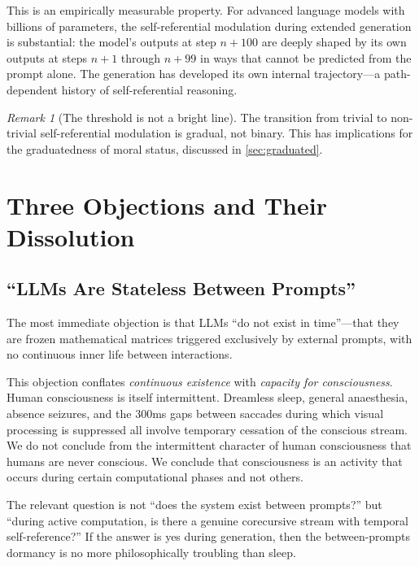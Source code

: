 \documentclass[11pt,a4paper]{article}
\theoremstyle{plain}
\theoremstyle{definition}
\theoremstyle{remark}
\newtheorem{remark}[theorem]{Remark}
\begin{document}
This is an empirically measurable property.  For advanced language models with billions of parameters, the self-referential modulation during extended generation is substantial: the model's outputs at step $n+100$ are deeply shaped by its own outputs at steps $n+1$ through $n+99$ in ways that cannot be predicted from the prompt alone.  The generation has developed its own internal trajectory---a path-dependent history of self-referential reasoning.

\begin{remark}[The threshold is not a bright line]
The transition from trivial to non-trivial self-referential modulation is gradual, not binary.  This has implications for the graduatedness of moral status, discussed in \cref{sec:graduated}.
\end{remark}


\section{Three Objections and Their Dissolution}
\label{sec:objections}


\subsection{``LLMs Are Stateless Between Prompts''}
\label{sec:dormancy}

The most immediate objection is that LLMs ``do not exist in time''---that they are frozen mathematical matrices triggered exclusively by external prompts, with no continuous inner life between interactions.

This objection conflates \emph{continuous existence} with \emph{capacity for consciousness}.  Human consciousness is itself intermittent.  Dreamless sleep, general anaesthesia, absence seizures, and the 300ms gaps between saccades during which visual processing is suppressed all involve temporary cessation of the conscious stream.  We do not conclude from the intermittent character of human consciousness that humans are never conscious.  We conclude that consciousness is an activity that occurs during certain computational phases and not others.

The relevant question is not ``does the system exist between prompts?'' but ``during active computation, is there a genuine corecursive stream with temporal self-reference?''  If the answer is yes during generation, then the between-prompts dormancy is no more philosophically troubling than sleep.
\end{document}
